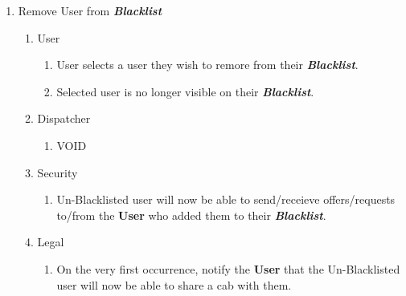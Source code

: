 \documentclass[english]{article}
\begin{document}
\begin{enumerate}[{BE}1.]
	\item Remove User from \textbf{\emph{Blacklist}}
	\begin{enumerate}[{VP11}.1]
		\item User
			\begin{enumerate}
				\item User selects a user they wish to remore from their \textbf{\emph{Blacklist}}.
				\item Selected user is no longer visible on their \textbf{\emph{Blacklist}}.
			\end{enumerate}
		\item Dispatcher
			\begin{enumerate}
				\item VOID
			\end{enumerate}
		\item Security
			\begin{enumerate}
				\item Un-Blacklisted user will now be able to send/receieve offers/requests to/from the \textbf{User} who added them to their \textbf{\emph{Blacklist}}.
			\end{enumerate}
		\item Legal
			\begin{enumerate}
				\item On the very first occurrence, notify the \textbf{User} that the Un-Blacklisted user will now be able to share a cab with them.
			\end{enumerate}
	\end{enumerate}
	

\end{enumerate}
\end{document}
